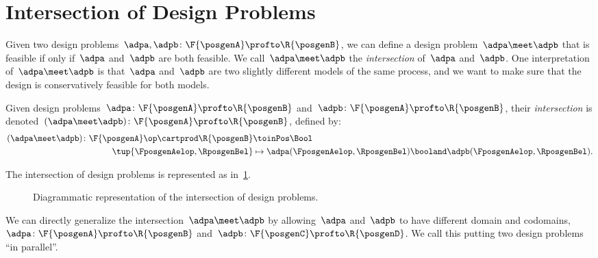 \section{Intersection of Design Problems}

Given two design problems~$\adpa, \adpb \colon \F{\posgenA} \profto \R{\posgenB}$, we can define a design problem~$\adpa \meet \adpb$ that is feasible if only if~$\adpa$ and~$\adpb$ are both feasible.
We call~$\adpa \meet \adpb$ the \emph{intersection} of~$\adpa$ and~$\adpb$.
One interpretation of~$\adpa \meet \adpb$ is that~$\adpa$ and~$\adpb$ are two slightly different models of the same process, and we want to make sure that the design is conservatively feasible for both models.

\begin{definition}
	\label{def:intersection_dp}
	\label{def:dp-intersection}
	Given design problems~$\adpa\colon \F{\posgenA} \profto \R{\posgenB}$ and~$\adpb\colon \F{\posgenA} \profto \R{\posgenB}$,
	their \emph{intersection} is denoted~$(\adpa \meet \adpb)\colon \F{\posgenA} \profto \R{\posgenB}$, defined by:
	\begin{equation}
		\begin{aligned}
			(\adpa \meet \adpb)
			\colon \F{\posgenA}\op \cartprod \R{\posgenB} & \toinPos \Bool                                                                         \\
			\tup{\FposgenAelop, \RposgenBel}              & \mapsto \adpa(\FposgenAelop, \RposgenBel) \booland  \adpb(\FposgenAelop, \RposgenBel).
		\end{aligned}
	\end{equation}
\end{definition}
The intersection of design problems is represented as in~\cref{fig:intersectiondp}.

\begin{figure}[h!]
	\centering
	\caption{Diagrammatic representation of the intersection of design problems. }
	\label{fig:intersectiondp}
\end{figure}

We can directly generalize the intersection~$\adpa \meet \adpb$ by allowing~$\adpa$ and~$\adpb$ to have different domain and codomains,~$\adpa \colon \F{\posgenA} \profto \R{\posgenB}$ and~$\adpb \colon \F{\posgenC} \profto \R{\posgenD}$.
We call this putting two design problems ``in parallel''.
